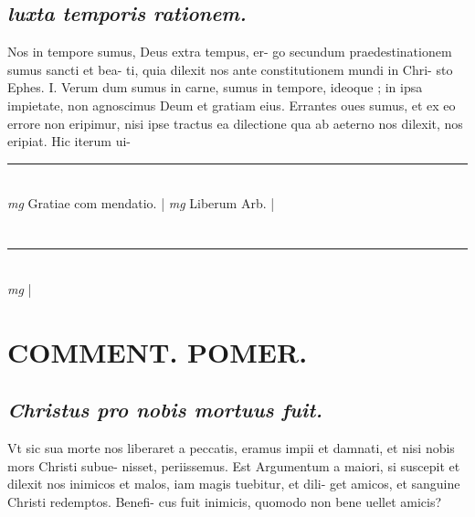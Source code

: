 \documentclass{article}
\begin{document}
\begin{pages}
\subsection*{\textit{luxta temporis rationem. }}\pstart Nos in tempore sumus, Deus extra tempus, er- go secundum praedestinationem sumus sancti et bea- ti, quia dilexit nos ante constitutionem mundi in Chri- sto Ephes. I. Verum dum sumus in carne, sumus in tempore, ideoque ; in ipsa impietate, non agnoscimus Deum et gratiam eius. Errantes oues sumus, et ex eo errore non eripimur, nisi ipse tractus ea dilectione qua ab aeterno nos dilexit, nos eripiat. Hic iterum ui-  \pend
\vspace{0.5cm}\noindent
\vspace{0.2cm}\rule{1cm}{0.2pt}\\ 
\hspace{0.2cm}\textit{mg}
\footnotesize Gratiae com mendatio. 
\normalsize| 
\hspace{0.2cm}\textit{mg}
\footnotesize Liberum Arb.  
\normalsize| 
\section*{    }
\marginpar{[ p.]}
{}
\subsection*{\textit{ }}\pstart            \pend\pstart            \pend
{}
{}
\subsection*{\textit{ }}\pstart    \pend\pstart      \pend
\vspace{0.5cm}\noindent
\vspace{0.2cm}\rule{1cm}{0.2pt}\\ 
\hspace{0.2cm}\textit{mg}
\footnotesize 
\normalsize| 
\section*{COMMENT. POMER.  }
{}
\subsection*{\textit{Christus pro nobis mortuus fuit. }}\pstart Vt sic sua morte nos liberaret a peccatis, eramus impii et damnati, et nisi nobis mors Christi subue- nisset, periissemus.   \pend\pstart Est Argumentum a maiori, si suscepit et dilexit nos inimicos et malos, iam magis tuebitur, et dili- get amicos, et sanguine Christi redemptos. Benefi- cus fuit inimicis, quomodo non bene uellet amicis?  \pend
{}
{}

\end{pages}
\end{document}
